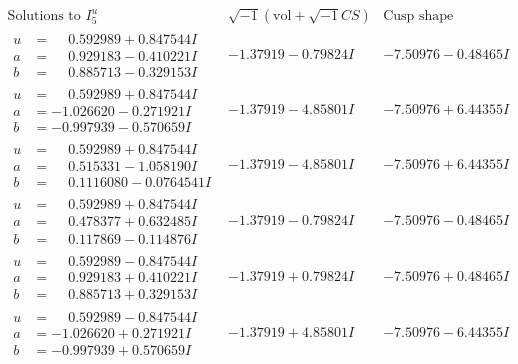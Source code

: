 \documentclass[1p]{elsarticle_modified}
\theoremstyle{definition}
\newcommand{\I}{\sqrt{-1}}
\begin{document}
$$\begin{array}{c|c|c}  
\text{Solutions to }I^u_{5}& \I (\text{vol} + \sqrt{-1}CS) & \text{Cusp shape}\\
 \hline 
\begin{aligned}
u &= \phantom{-}0.592989 + 0.847544 I \\
a &= \phantom{-}0.929183 - 0.410221 I \\
b &= \phantom{-}0.885713 - 0.329153 I\end{aligned}
 & -1.37919 - 0.79824 I & -7.50976 - 0.48465 I \\ \hline\begin{aligned}
u &= \phantom{-}0.592989 + 0.847544 I \\
a &= -1.026620 - 0.271921 I \\
b &= -0.997939 - 0.570659 I\end{aligned}
 & -1.37919 - 4.85801 I & -7.50976 + 6.44355 I \\ \hline\begin{aligned}
u &= \phantom{-}0.592989 + 0.847544 I \\
a &= \phantom{-}0.515331 - 1.058190 I \\
b &= \phantom{-}0.1116080 - 0.0764541 I\end{aligned}
 & -1.37919 - 4.85801 I & -7.50976 + 6.44355 I \\ \hline\begin{aligned}
u &= \phantom{-}0.592989 + 0.847544 I \\
a &= \phantom{-}0.478377 + 0.632485 I \\
b &= \phantom{-}0.117869 - 0.114876 I\end{aligned}
 & -1.37919 - 0.79824 I & -7.50976 - 0.48465 I \\ \hline\begin{aligned}
u &= \phantom{-}0.592989 - 0.847544 I \\
a &= \phantom{-}0.929183 + 0.410221 I \\
b &= \phantom{-}0.885713 + 0.329153 I\end{aligned}
 & -1.37919 + 0.79824 I & -7.50976 + 0.48465 I \\ \hline\begin{aligned}
u &= \phantom{-}0.592989 - 0.847544 I \\
a &= -1.026620 + 0.271921 I \\
b &= -0.997939 + 0.570659 I\end{aligned}
 & -1.37919 + 4.85801 I & -7.50976 - 6.44355 I \\ \hline\begin{aligned}

\end{aligned}
\end{array}$$
\end{document}
